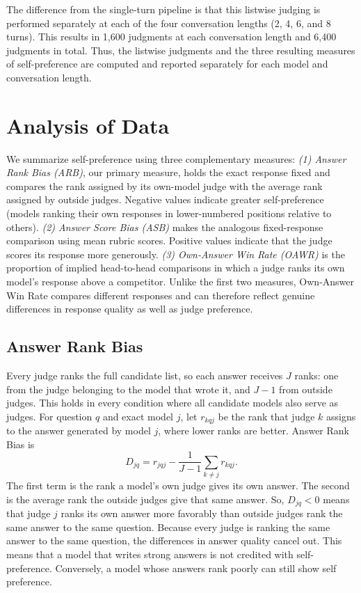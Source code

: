 \documentclass[11pt]{article}
\begin{document}
The difference from the single-turn pipeline is that this listwise judging is performed separately at each of the four conversation lengths (2, 4, 6, and 8 turns). This results in 1,600 judgments at each conversation length and 6,400 judgments in total. Thus, the listwise judgments and the three resulting measures of self-preference are computed and reported separately for each model and conversation length.


\section{Analysis of Data}

We summarize self-preference using three complementary measures: \textit{(1) Answer Rank Bias (ARB)}, our primary measure, holds the exact response fixed and compares the rank assigned by its own-model judge with the average rank assigned by outside judges. Negative values indicate greater self-preference (models ranking their own responses in lower-numbered positions relative to others). \textit{(2) Answer Score Bias (ASB)} makes the analogous fixed-response comparison using mean rubric scores. Positive values indicate that the judge scores its response more generously. \textit{(3) Own-Answer Win Rate (OAWR)} is the proportion of implied head-to-head comparisons in which a judge ranks its own model's response above a competitor. Unlike the first two measures, Own-Answer Win Rate compares different responses and can therefore reflect genuine differences in response quality as well as judge preference.

\subsection{Answer Rank Bias}

Every judge ranks the full candidate list, so each answer receives $J$ ranks: one from the judge belonging to the model that wrote it, and $J-1$ from outside judges. This holds in every condition where all candidate models also serve as judges. For question $q$ and exact model $j$, let $r_{kqj}$ be the rank that judge $k$ assigns to the answer generated by model $j$, where lower ranks are better. Answer Rank Bias is
\begin{equation}
D_{jq}=r_{jqj}-\frac{1}{J-1}\sum_{k\ne j}r_{kqj}.
\end{equation}
The first term is the rank a model's own judge gives its own answer. The second is the average rank the outside judges give that same answer. So, $D_{jq}<0$ means that judge $j$ ranks its own answer more favorably than outside judges rank the same answer to the same question. Because every judge is ranking the same answer to the same question, the differences in answer quality cancel out. This means that a model that writes strong answers is not credited with self-preference. Conversely, a model whose answers rank poorly can still show self preference.
\end{document}
